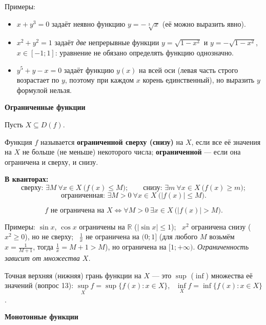 \documentclass[a4paper,11pt]{article}
\newcommand{\R}{\mathbb{R}}
\newcommand{\kv}{\par\noindent\textbf{\textcolor{oprc!85!black}{В кванторах:}}}
\newcommand{\podr}[1]{\par\needspace{8\baselineskip}\medskip
  {\large\bfseries\textcolor{oprc!80!black}{#1}}\par\nopagebreak\smallskip}
\begin{document}
Примеры:
\begin{itemize}[leftmargin=*]
  \item $x + y^3 = 0$ задаёт неявно функцию $y = -\sqrt[3]{x}$ (её можно выразить явно).
  \item $x^2 + y^2 = 1$ задаёт \emph{две} непрерывные функции $y = \sqrt{1 - x^2}$ и $y = -\sqrt{1 - x^2}$, $x \in [-1; 1]$:
        уравнение не обязано определять функцию однозначно.
  \item $y^5 + y - x = 0$ задаёт функцию $y(x)$ на всей оси (левая часть строго возрастает по $y$, поэтому при каждом $x$ корень
        единственный), но выразить $y$ формулой нельзя.
\end{itemize}

\podr{Ограниченные функции}

Пусть $X \subseteq D(f)$.

\begin{opr}
Функция $f$ называется \textbf{ограниченной сверху (снизу)} на $X$, если все её значения на $X$ не больше (не меньше) некоторого числа;
\textbf{ограниченной} --- если она ограничена и сверху, и снизу.
\kv
\[
  \text{сверху: } \exists M\ \forall x \in X\ \bigl(f(x) \le M\bigr); \qquad
  \text{снизу: } \exists m\ \forall x \in X\ \bigl(f(x) \ge m\bigr);
\]
\[
  \text{ограниченная: } \exists M > 0\ \forall x \in X\ \bigl(|f(x)| \le M\bigr).
\]
\end{opr}

\begin{opr}
\[
  f \text{ не ограничена на } X \Leftrightarrow \forall M > 0\ \exists x \in X\ \bigl(|f(x)| > M\bigr).
\]
\end{opr}

Примеры: $\sin x$, $\cos x$ ограничены на $\R$ ($|\sin x| \le 1$); \ $x^2$ ограничена снизу ($x^2 \ge 0$), но не сверху; \
$\frac1x$ не ограничена на $(0; 1]$ (для любого $M$ возьмём $x = \frac{1}{M + 1}$, тогда $\frac1x = M + 1 > M$), но ограничена на $[1; +\infty)$.
\emph{Ограниченность зависит от множества $X$.}

Точная верхняя (нижняя) грань функции на $X$ --- это $\sup$ ($\inf$) множества её значений (вопрос 13):
$\sup\limits_{X} f = \sup\{f(x) : x \in X\}$, \ $\inf\limits_{X} f = \inf\{f(x) : x \in X\}$.

\podr{Монотонные функции}
\end{document}
